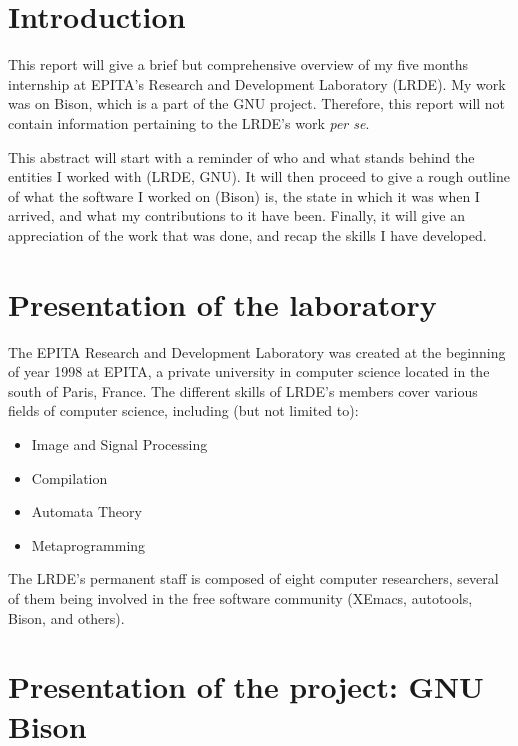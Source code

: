 \documentclass[a4paper,11pt,final]{article}
\begin{document}
  \sloppy
  \setcounter{page}{1}
  \section*{Introduction}

  This report will give a brief but comprehensive overview of my five months
  internship at EPITA's Research and Development Laboratory (LRDE).  My work
  was on Bison, which is a part of the GNU project.  Therefore, this report
  will not contain information pertaining to the LRDE's work \textit{per se}.

  This abstract will start with a reminder of who and what stands behind the
  entities I worked with (LRDE, GNU). It will then proceed to give a rough
  outline of what the software I worked on (Bison) is, the state in which it
  was when I arrived, and what my contributions to it have been. Finally, it
  will give an appreciation of the work that was done, and recap the skills I
  have developed.

  \section*{Presentation of the laboratory}

  The EPITA Research and Development Laboratory was created at the
  beginning of year 1998 at EPITA, a private university in computer science
  located in the south of Paris, France. The different skills of LRDE's members
  cover various fields of computer science, including (but not limited to):

  \begin{itemize}
    \item Image and Signal Processing
    \item Compilation
    \item Automata Theory
    \item Metaprogramming
  \end{itemize}

  The LRDE's permanent staff is composed of eight computer researchers, several
  of them being involved in the free software community (XEmacs, autotools,
  Bison, and others).

  \section*{Presentation of the project: GNU Bison}
\end{document}
